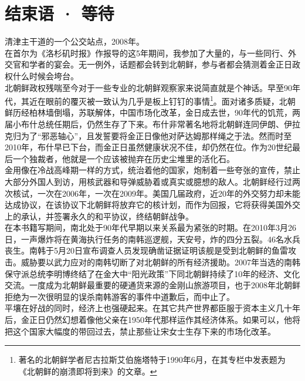 \fancyhead[RO]{\thepage}
\fancyhead[LE]{\thepage}
\fancyfoot[LE,RO]{}
\fancyfoot[LO,CE]{}
\fancyfoot[CO,RE]{}
\chapter*{结束语 · 等待}
清津主干道的一个公交站点，2008年。\\

在首尔为《洛杉矶时报》作报导的这5年期间，我参加了大量的，与一些同行、外交官和学者的宴会。无一例外，话题都会转到北朝鲜，参与者都会猜测着金正日政权什么时候会垮台。\\

北朝鲜政权残喘至今对于一些专业的北朝鲜观察家来说简直就是个神话。早至90年代，其近在眼前的覆灭被一致认为几乎是板上钉钉的事情\footnote{著名的北朝鲜学者尼古拉斯艾伯施塔特于1990年6月，在其专栏中发表题为《北朝鲜的崩溃即将到来》的文章。}。面对诸多质疑，北朝鲜历经柏林墙倒塌，苏联解体，中国市场化改革，金日成去世，90年代的饥荒，两届小布什总统任期后，仍然生存了下来。布什非常著名地将北朝鲜连同伊朗、伊拉克归为了“邪恶轴心”，且发誓要将金正日像他对萨达姆那样绳之于法。然而时至2010年，布什早已下台，而金正日虽然健康状况不佳，却仍然在位。作为20世纪最后一个独裁者，他就是一个应该被抛弃在历史尘堆里的活化石。\\

金用像在冷战高峰期一样的方式，统治着他的国家，炮制着一些夸张的宣传，禁止大部分外国人到访，用核武器和导弹威胁着或真实或臆想的敌人。北朝鲜经行过两次核试，一次在2006年，一次在2009年。美国几届政府，近20年的外交努力却未能达成协议，在该协议下北朝鲜将放弃它的核计划，而作为回报，它将获得美国外交上的承认，并签署永久的和平协议，终结朝鲜战争。\\

在本书籍写期间，南北处于90年代早期以来关系最为紧张的时期。在2010年3月26日，一声爆炸将在黄海执行任务的南韩巡逻舰，天安号，炸的四分五裂。46名水兵丧生。南韩于5月20日宣布调查人员发现确凿证据证明该舰是受到北朝鲜的鱼雷攻击。威胁要以武力应对的南韩切断了对北朝鲜的所有经济援助。2007年当选的南韩保守派总统李明博终结了在金大中“阳光政策”下同北朝鲜持续了10年的经济、文化交流。一度成为北朝鲜最重要的硬通货来源的金刚山旅游项目，也于2008年北朝鲜拒绝为一次很明显的误杀南韩游客的事件中道歉后，而中止了。\\

平壤在好战的同时，经济上也强硬起来。在其它共产世界都臣服于资本主义几十年后，金正日仍然幻想着像他父亲在1950年代那样运作其经济体系。如果可以，他将把这个国家大幅度的带回过去，禁止那些让宋女士生存下来的市场化改革。\\

